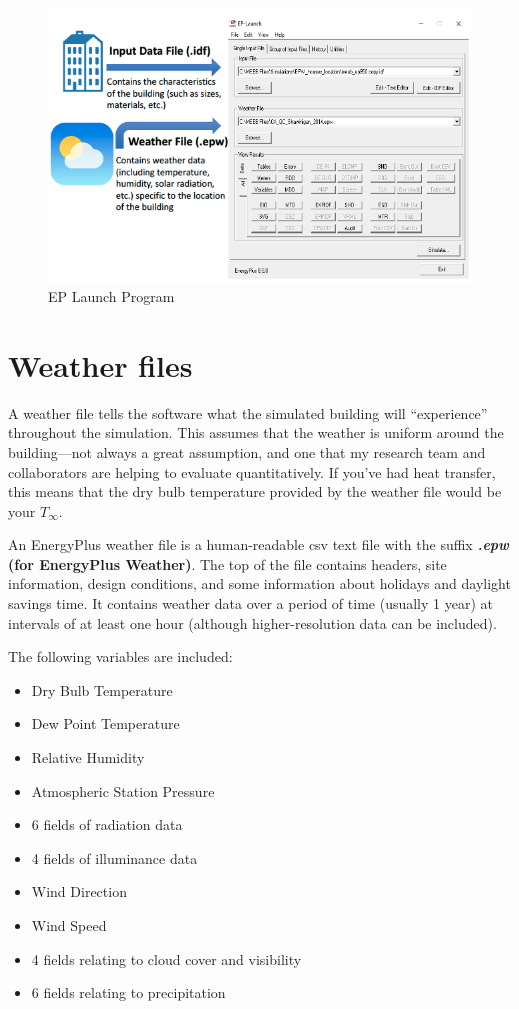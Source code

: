 \documentclass[10pt]{article}
\begin{document}
            \begin{figure}[h]
            \centering
            \includegraphics[width=5in]{extras08/EPinterface.png}
            \caption{EP Launch Program \cite{Bianchi-dissertation}}
            \label{EPlaunch}
            \end{figure}




\section{Weather files}

A weather file tells the software what the simulated building will ``experience'' throughout the simulation. This assumes that the weather is uniform around the building---not always a great assumption, and one that my research team and collaborators are helping to evaluate quantitatively. If you've had heat transfer, this means that the dry bulb temperature provided by the weather file would be your $T_\infty$. 

An EnergyPlus weather file is a human-readable csv text file with the suffix \textbf{\textit{.epw} (for EnergyPlus Weather)}. The top of the file contains headers, site information, design conditions, and some information about holidays and daylight savings time. It contains weather data over a period of time (usually 1 year) at intervals of at least one hour (although higher-resolution data can be included). 


The following variables are included:
\begin{itemize}
    \setlength{\itemsep}{0pt}%
    \setlength{\parskip}{0pt}%
    \item Dry Bulb Temperature
    \item Dew Point Temperature
    \item  Relative Humidity
    \item  Atmospheric Station Pressure
    \item 6 fields of radiation data
    \item 4 fields of illuminance data
    \item Wind Direction
    \item  Wind Speed
    \item 4 fields relating to cloud cover and visibility
    \item 6 fields relating to precipitation
\end{itemize}
\end{document}
